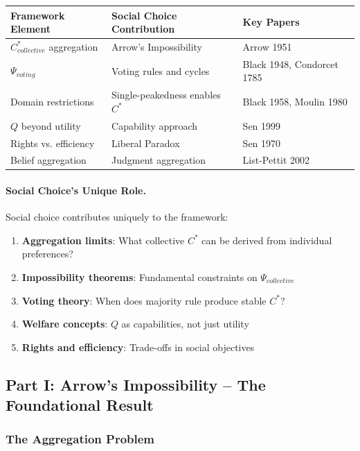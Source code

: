 \begin{center}
\renewcommand{\arraystretch}{1.4}
\begin{tabular}{|l|l|l|}
\hline
\textbf{Framework Element} & \textbf{Social Choice Contribution} & \textbf{Key Papers} \\
\hline
$C^*_{collective}$ aggregation & Arrow's Impossibility & Arrow 1951 \\
$\Psi_{voting}$ & Voting rules and cycles & Black 1948, Condorcet 1785 \\
Domain restrictions & Single-peakedness enables $C^*$ & Black 1958, Moulin 1980 \\
$Q$ beyond utility & Capability approach & Sen 1999 \\
Rights vs. efficiency & Liberal Paradox & Sen 1970 \\
Belief aggregation & Judgment aggregation & List-Pettit 2002 \\
\hline
\end{tabular}
\end{center}

\paragraph{Social Choice's Unique Role.}
Social choice contributes uniquely to the framework:
\begin{enumerate}
    \item \textbf{Aggregation limits}: What collective $C^*$ can be derived from individual preferences?
    \item \textbf{Impossibility theorems}: Fundamental constraints on $\Psi_{collective}$
    \item \textbf{Voting theory}: When does majority rule produce stable $C^*$?
    \item \textbf{Welfare concepts}: $Q$ as capabilities, not just utility
    \item \textbf{Rights and efficiency}: Trade-offs in social objectives
\end{enumerate}

\subsection{Part I: Arrow's Impossibility – The Foundational Result}

\subsubsection{The Aggregation Problem}

